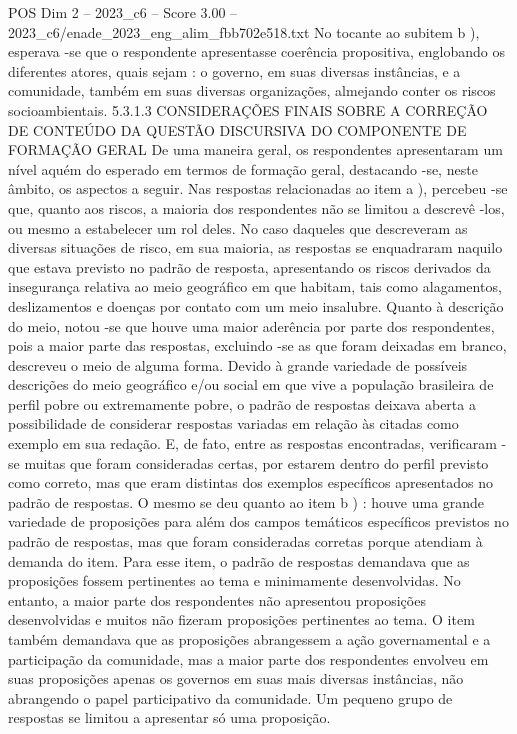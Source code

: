 \begin{textsample}{POS Dim 2 – 2023\_c6 – Score 3.00 – 2023\_c6/enade\_2023\_eng\_alim\_fbb702e518.txt}
No tocante ao subitem b ), esperava -se que o respondente apresentasse coerência propositiva, englobando os diferentes atores, quais sejam : o governo, em suas diversas instâncias, e a comunidade, também em suas diversas organizações, almejando conter os riscos socioambientais. 5.3.1.3 CONSIDERAÇÕES FINAIS SOBRE A CORREÇÃO DE CONTEÚDO DA QUESTÃO DISCURSIVA DO COMPONENTE DE FORMAÇÃO GERAL De uma maneira geral, os respondentes apresentaram um nível aquém do esperado em termos de formação geral, destacando -se, neste âmbito, os aspectos a seguir.
Nas respostas relacionadas ao item a ), percebeu -se que, quanto aos riscos, a maioria dos respondentes não se limitou a descrevê -los, ou mesmo a estabelecer um rol deles.
No caso daqueles que descreveram as diversas situações de risco, em sua maioria, as respostas se enquadraram naquilo que estava previsto no padrão de resposta, apresentando os riscos derivados da insegurança relativa ao meio geográfico em que habitam, tais como alagamentos, deslizamentos e doenças por contato com um meio insalubre.
Quanto à descrição do meio, notou -se que houve uma maior aderência por parte dos respondentes, pois a maior parte das respostas, excluindo -se as que foram deixadas em branco, descreveu o meio de alguma forma.
Devido à grande variedade de possíveis descrições do meio geográfico e/ou social em que vive a população brasileira de perfil pobre ou extremamente pobre, o padrão de respostas deixava aberta a possibilidade de considerar respostas variadas em relação às citadas como exemplo em sua redação.
E, de fato, entre as respostas encontradas, verificaram -se muitas que foram consideradas certas, por estarem dentro do perfil previsto como correto, mas que eram distintas dos exemplos específicos apresentados no padrão de respostas.
O mesmo se deu quanto ao item b ) : houve uma grande variedade de proposições para além dos campos temáticos específicos previstos no padrão de respostas, mas que foram consideradas corretas porque atendiam à demanda do item.
Para esse item, o padrão de respostas demandava que as proposições fossem pertinentes ao tema e minimamente desenvolvidas.
No entanto, a maior parte dos respondentes não apresentou proposições desenvolvidas e muitos não fizeram proposições pertinentes ao tema.
O item também demandava que as proposições abrangessem a ação governamental e a participação da comunidade, mas a maior parte dos respondentes envolveu em suas proposições apenas os governos em suas mais diversas instâncias, não abrangendo o papel participativo da comunidade.
Um pequeno grupo de respostas se limitou a apresentar só uma proposição.

\end{textsample}
